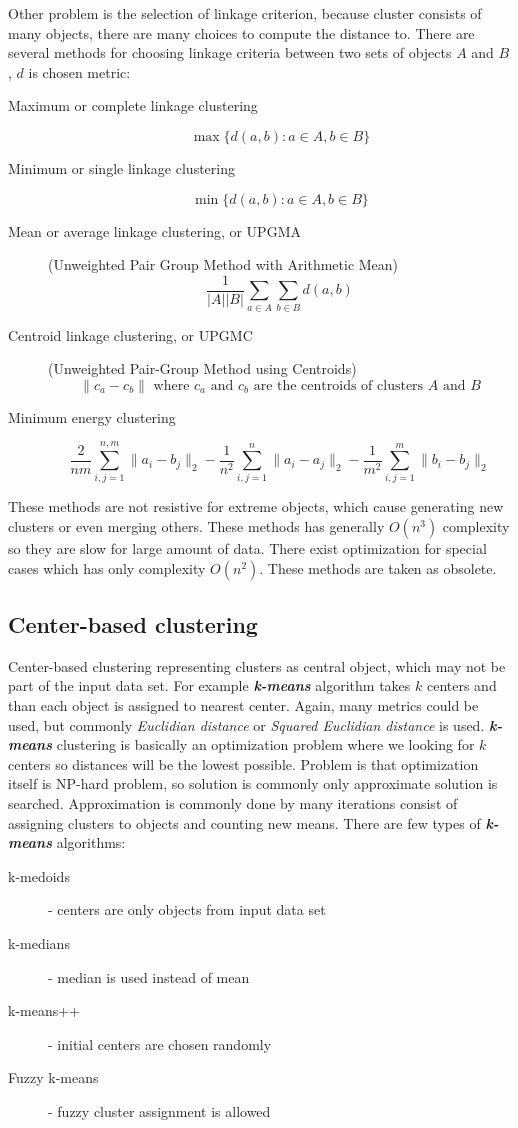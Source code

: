 Other problem is the selection of linkage criterion, because cluster consists of many objects, there are many choices to compute the distance to. There are several methods for choosing linkage criteria between two sets of objects $A$ and $B$, $d$ is chosen metric:
\begin{description}
\item[Maximum or complete linkage clustering] $$\max\{d(a,b) : a \in A, b \in B\}$$
\item[Minimum or single linkage clustering] $$\min\{d(a,b) : a \in A, b \in B\}$$
\item[Mean or average linkage clustering, or UPGMA] (Unweighted Pair Group Method with Arithmetic Mean) $$\frac{1}{|A||B|}\sum_{a \in A} \sum_{b \in B} d(a,b)$$
\item[Centroid linkage clustering, or UPGMC] (Unweighted Pair-Group Method using Centroids) $$\|c_a - c_b\| \mbox{ where } c_a \mbox{ and } c_b \mbox{ are the centroids of clusters } A \mbox{ and } B$$
\item[Minimum energy clustering] $$\frac{2}{nm}\sum_{i,j=1}^{n,m}\|a_i-b_j\|_2-\frac{1}{n^2}\sum_{i,j=1}^{n}\|a_i-a_j\|_2-\frac{1}{m^2}\sum_{i,j=1}^{m}\|b_{i}-b_{j}\|_{2}$$
\end{description}

These methods are not resistive for extreme objects, which cause generating new clusters or even merging others. These methods has generally $O(n^3)$ complexity so they are slow for large amount of data. There exist optimization for special cases which has only complexity $O(n^2)$. These methods are taken as obsolete.
\subsection{Center-based clustering} \label{ssec:centerClustering}
Center-based clustering representing clusters as central object, which may not be part of the input data set.  For example \textit{\textbf{k-means}} algorithm takes $k$ centers and than each object is assigned to nearest center. Again, many metrics could be used, but commonly \textit{Euclidian distance} or \textit{Squared Euclidian distance} is used. \textit{\textbf{k-means}} clustering is basically an optimization problem where we looking for $k$ centers so distances will be the lowest possible. Problem is that optimization itself is NP-hard problem, so solution is commonly only approximate solution is searched. Approximation is commonly done by many iterations consist of assigning clusters to objects and  counting new means.
There are few types of \textit{\textbf{k-means}} algorithms:
\begin{description}
\item[k-medoids] - centers are only objects from input data set
\item[k-medians] - median is used instead of mean
\item[k-means++] - initial centers are chosen randomly
\item[Fuzzy k-means] - fuzzy cluster assignment is allowed
\end{description}

